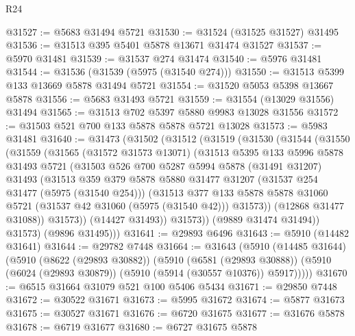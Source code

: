 \begin{lexlean}{R24}
\begin{coremodule}
@31527 := @5683 @31494 @5721
@31530 := @31524 (@31525 @31527) @31495
@31536 := @31513 @395 @5401 @5878 @13671 @31474 @31527
@31537 := @5970 @31481
@31539 := @31537 @274 @31474
@31540 := @5976 @31481
@31544 := @31536 (@31539 (@5975 (@31540 @274)))
@31550 := @31513 @5399 @133 @13669 @5878 @31494 @5721
@31554 := @31520 @5053 @5398 @13667 @5878
@31556 := @5683 @31493 @5721
@31559 := @31554 (@13029 @31556) @31494
@31565 := @31513 @702 @5397 @5880 @9983 @13028 @31556
@31572 := @31503 @521 @700 @133 @5878 @5878 @5721 @13028
@31573 := @5983 @31481
@31640 := @31473
    (@31502
      (@31512
        (@31519
          (@31530
            (@31544
              (@31550
                (@31559
                  (@31565
                    (@31572 @31573 @13071)
                    (@31513
                      @5395
                      @133
                      @5996
                      @5878
                      @31493
                      @5721
                      (@31503
                        @526
                        @700
                        @5287
                        @5994
                        @5878
                        (@31491 @31207)
                        @31493
                        (@31513
                          @359
                          @379
                          @5878
                          @5880
                          @31477
                          @31207
                          (@31537 @254 @31477 (@5975 (@31540 @254)))
                          (@31513
                            @377
                            @133
                            @5878
                            @5878
                            @31060
                            @5721
                            (@31537 @42 @31060 (@5975 (@31540 @42)))
                            @31573))
                        (@12868 @31477 @31088))
                      @31573))
                  (@14427 @31493))
                @31573))
            (@9889 @31474 @31494))
          @31573)
        (@9896 @31495)))
@31641 := @29893 @6496
@31643 := @5910 (@14482 @31641)
@31644 := @29782 @7448
@31664 := @31643
    (@5910
      (@14485 @31644)
      (@5910
        (@8622 (@29893 @30882))
        (@5910
          (@6581 (@29893 @30888))
          (@5910 (@6024 (@29893 @30879)) (@5910 (@5914 (@30557 @10376)) @5917)))))
@31670 := @6515 @31664 @31079 @521 @100 @5406 @5434
@31671 := @29850 @7448
@31672 := @30522 @31671
@31673 := @5995 @31672
@31674 := @5877 @31673
@31675 := @30527 @31671
@31676 := @6720 @31675
@31677 := @31676 @5878
@31678 := @6719 @31677
@31680 := @6727 @31675 @5878

\end{coremodule}
\end{lexlean}
